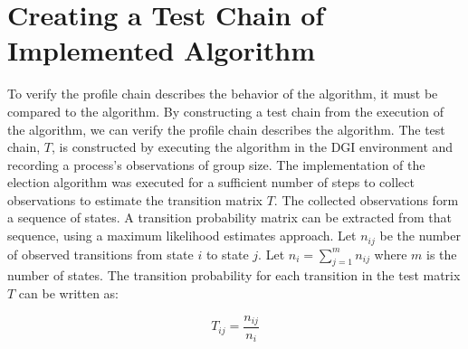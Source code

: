 
\section{Creating a Test Chain of Implemented Algorithm}

To verify the profile chain describes the behavior of the algorithm, it must be compared to the algorithm.
By constructing a test chain from the execution of the algorithm, we can verify the profile chain describes the algorithm.
The test chain, $T$, is constructed by executing the algorithm in the DGI environment and recording a process's observations of group size.
The implementation of the election algorithm was executed for a sufficient number of steps to collect observations to estimate the transition matrix $T$.
The collected observations form a sequence of states.
A transition probability matrix can be extracted from that sequence, using a maximum likelihood estimates approach.
Let $n_{ij}$ be the number of observed transitions from state $i$ to state $j$. Let $n_{i}=\sum_{j=1}^{m} n_{ij}$ where $m$ is the number of states.
The transition probability for each transition in the test matrix $T$ can be written as:

\[ T_{ij} = \frac{n_{ij}}{n_{i}} \]
